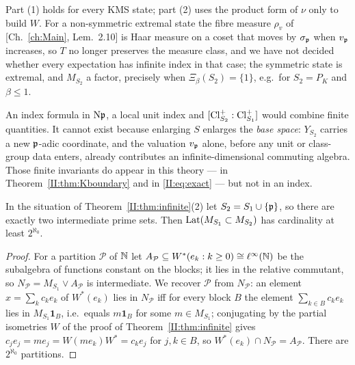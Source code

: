\begin{remark}[Scope]\label{II:rem:scope}
Part (1) holds for every KMS state; part (2) uses the product form of $\nu$ only to build
$W$. For a non-symmetric extremal state the fibre measure $\rho_v$ of [Ch.~\ref{ch:Main}, Lem.~2.10]
is Haar measure on a coset that moves by $\sigma_{\mathfrak{p}}$ when $v_{\mathfrak{p}}$ increases, so $T$ no
longer preserves the measure class, and we have not decided whether every expectation has
infinite index in that case; the symmetric state is extremal, and $M_{S_2}$ a factor,
precisely when $\Xi_\beta(S_2)=\{1\}$, e.g.\ for $S_2=P_K$ and $\beta\le1$.
\end{remark}

\begin{remark}\label{II:rem:noformula}
An index formula in $\mathrm{N}\mathfrak{p}$, a local unit index and $[\operatorname{Cl}^+_{S_2}:\operatorname{Cl}^+_{S_1}]$ would
combine finite quantities. It cannot exist because enlarging $S$ enlarges the \emph{base
space}: $Y_{S_2}$ carries a new $\mathfrak{p}$-adic coordinate, and the valuation $v_{\mathfrak{p}}$ alone,
before any unit or class-group data enters, already contributes an infinite-dimensional
commuting algebra. Those finite invariants do appear in this theory --- in
Theorem~\ref{II:thm:Kboundary} and in \eqref{II:eq:exact} --- but not in an index.
\end{remark}

\begin{proposition}\label{II:prop:nogalois}
In the situation of Theorem~\ref{II:thm:infinite}(2) let $S_2=S_1\cup\{\mathfrak{p}\}$, so there are
exactly two intermediate prime sets. Then $\operatorname{Lat}(M_{S_1}\subset M_{S_2})$ has cardinality
at least $2^{\aleph_0}$.
\end{proposition}

\begin{proof}
For a partition $\mathcal P$ of $\mathbb{N}$ let $A_{\mathcal P}\subseteq W^*(e_k:k\ge0)\cong\ell^\infty(\mathbb{N})$
be the subalgebra of functions constant on the blocks; it lies in the relative commutant, so
$N_{\mathcal P}=M_{S_1}\vee A_{\mathcal P}$ is intermediate. We recover $\mathcal P$ from
$N_{\mathcal P}$: an element $x=\sum_kc_ke_k$ of $W^*(e_k)$ lies in $N_{\mathcal P}$ iff for
every block $B$ the element $\sum_{k\in B}c_ke_k$ lies in $M_{S_1}\mathbf 1_B$, i.e.\ equals
$m\mathbf 1_B$ for some $m\in M_{S_1}$; conjugating by the partial isometries $W$ of the proof
of Theorem~\ref{II:thm:infinite} gives $c_je_j=me_j=W(me_k)W^*=c_ke_j$ for $j,k\in B$, so
$W^*(e_k)\cap N_{\mathcal P}=A_{\mathcal P}$. There are $2^{\aleph_0}$ partitions.
\end{proof}


